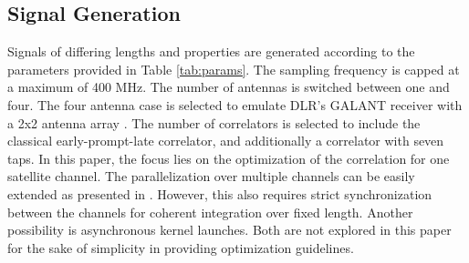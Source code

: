 \documentclass{juliacon}
\begin{document}
\subsection*{Signal Generation}



Signals of differing lengths and properties are generated according to the parameters provided in Table \ref{tab:params}. The sampling frequency is capped at a maximum of 400 MHz. The number of antennas is switched between one and four. The four antenna case is selected to emulate DLR's GALANT receiver with a 2x2 antenna array \cite{Cuntz2009}. The number of correlators is selected to include the classical early-prompt-late correlator, and additionally a correlator with seven taps. In this paper, the focus lies on the optimization of the correlation for one satellite channel. The parallelization over multiple channels can be easily extended as presented in \cite{Xu2017}. However, this also requires strict synchronization between the channels for coherent integration over fixed length. Another possibility is asynchronous kernel launches. Both are not explored in this paper for the sake of simplicity in providing optimization guidelines.
\end{document}
